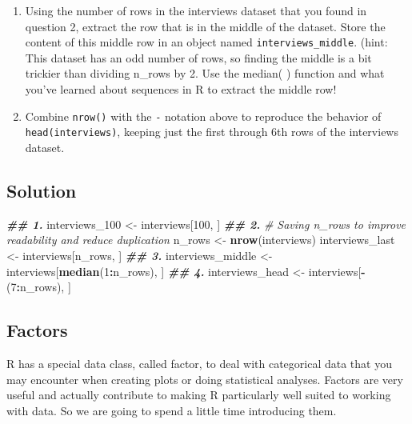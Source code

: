 \documentclass[
]{article}
\newenvironment{Shaded}{\begin{snugshade}}{\end{snugshade}}
\newcommand{\CommentTok}[1]{\textcolor[rgb]{0.56,0.35,0.01}{\textit{#1}}}
\newcommand{\DecValTok}[1]{\textcolor[rgb]{0.00,0.00,0.81}{#1}}
\newcommand{\DocumentationTok}[1]{\textcolor[rgb]{0.56,0.35,0.01}{\textbf{\textit{#1}}}}
\newcommand{\FunctionTok}[1]{\textcolor[rgb]{0.13,0.29,0.53}{\textbf{#1}}}
\newcommand{\NormalTok}[1]{#1}
\newcommand{\OtherTok}[1]{\textcolor[rgb]{0.56,0.35,0.01}{#1}}
\newcommand{\SpecialCharTok}[1]{\textcolor[rgb]{0.81,0.36,0.00}{\textbf{#1}}}
\begin{document}
\begin{enumerate}
\def\labelenumi{\arabic{enumi}.}
\setcounter{enumi}{2}
\item
  Using the number of rows in the interviews dataset that you found in
  question 2, extract the row that is in the middle of the dataset.
  Store the content of this middle row in an object named
  \texttt{interviews\_middle}. (hint: This dataset has an odd number of
  rows, so finding the middle is a bit trickier than dividing n\_rows by
  2. Use the median( ) function and what you've learned about sequences
  in R to extract the middle row!
\item
  Combine \texttt{nrow()} with the \texttt{-} notation above to
  reproduce the behavior of \texttt{head(interviews)}, keeping just the
  first through 6th rows of the interviews dataset.
\end{enumerate}

\subsection{Solution}\label{solution}

\begin{Shaded}
\begin{Highlighting}[]
\DocumentationTok{\#\# 1.}
\NormalTok{interviews\_100 }\OtherTok{\textless{}{-}}\NormalTok{ interviews[}\DecValTok{100}\NormalTok{, ]}
\DocumentationTok{\#\# 2.}
\CommentTok{\# Saving \textasciigrave{}n\_rows\textasciigrave{} to improve readability and reduce duplication}
\NormalTok{n\_rows }\OtherTok{\textless{}{-}} \FunctionTok{nrow}\NormalTok{(interviews)}
\NormalTok{interviews\_last }\OtherTok{\textless{}{-}}\NormalTok{ interviews[n\_rows, ]}
\DocumentationTok{\#\# 3.}
\NormalTok{interviews\_middle }\OtherTok{\textless{}{-}}\NormalTok{ interviews[}\FunctionTok{median}\NormalTok{(}\DecValTok{1}\SpecialCharTok{:}\NormalTok{n\_rows), ]}
\DocumentationTok{\#\# 4.}
\NormalTok{interviews\_head }\OtherTok{\textless{}{-}}\NormalTok{ interviews[}\SpecialCharTok{{-}}\NormalTok{(}\DecValTok{7}\SpecialCharTok{:}\NormalTok{n\_rows), ]}
\end{Highlighting}
\end{Shaded}

\subsection{Factors}\label{factors}

R has a special data class, called factor, to deal with categorical data
that you may encounter when creating plots or doing statistical
analyses. Factors are very useful and actually contribute to making R
particularly well suited to working with data. So we are going to spend
a little time introducing them.
\end{document}
